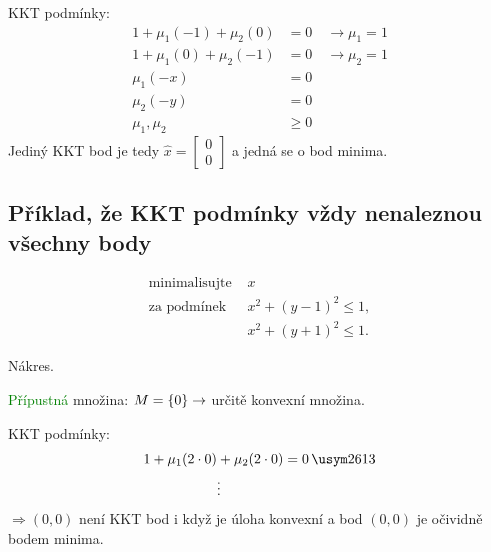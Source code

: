 KKT podmínky:
\begin{align*}
    1 + \mu_1 (-1) + \mu_2 (0)  &= 0 \quad \rightarrow \mu_1 = 1 \\
    1 + \mu_1 (0) +  \mu_2 (-1) &= 0 \quad \rightarrow \mu_2 = 1 \\
    \mu_1 (-x) &= 0 \\
    \mu_2 (-y) &= 0 \\
    \mu_1, \mu_2 &\geq 0
\end{align*}
Jediný KKT bod je tedy 
$\hat x = \begin{bmatrix}
    0 \\
    0
\end{bmatrix}$ a jedná se o bod minima.

\subsection{Příklad, že KKT podmínky vždy nenaleznou všechny body}
\begin{align*}
    \text{minimalisujte } &x \\
    \text{za podmínek } &x^2 + (y-1)^2 \leq 1, \\
    &x^2 + (y+1)^2 \leq 1.
\end{align*}

\begin{multicols}{2}
    Nákres.

\columnbreak

    \textcolor{green}{Přípustná} množina: $M = \left\lbrace 0 \right\rbrace \rightarrow$ určitě konvexní množina.

    KKT podmínky: 
    \begin{align*}
        1 + \mu_1 (2 \cdot 0) &+ \mu_2 (2 \cdot 0) = 0 \, \xmark \\
        &\vdots
    \end{align*}
    $\Rightarrow (0,0)$ není KKT bod i když je úloha konvexní a bod $(0,0)$ je očividně bodem minima.
\end{multicols}

